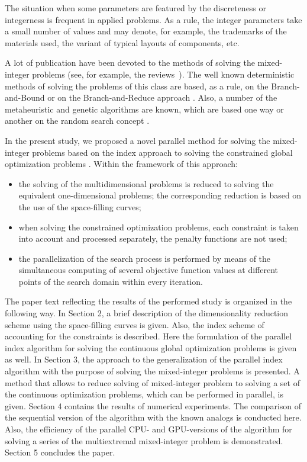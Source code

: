 \documentclass{llncs}
\begin{document}
The situation when some parameters are featured by the discreteness or integerness is frequent 
in applied problems. As a rule, the integer parameters take a small number of values and may 
denote, for example, the trademarks of the materials used, the variant of typical layouts of 
components, etc.

A lot of publication have been devoted to the methods of solving the mixed-integer problems 
(see, for example, the reviews~\cite{Burer,Boukouvala}). The well known deterministic 
methods of solving the problems of this class are based, as a rule, on the Branch-and-Bound 
\cite{Belotti} or on the Branch-and-Reduce approach \cite{Vigerske}. Also, a number of 
the metaheuristic and genetic 
algorithms are known, which are based one way or another on the random search concept 
\cite{Deep,Schluter}.

In the present study, we proposed a novel parallel method for solving the mixed-integer 
problems based on the index approach to solving the constrained global optimization 
problems \cite{Strongin2000,Strongin2013}. 
Within the framework of this approach: 
\begin{itemize}
	\item 
	the solving of the multidimensional problems is reduced to solving the equivalent one-dimensional problems; the corresponding reduction is based on the use of the space-filling curves;
	\item 
	when solving the constrained optimization problems, each constraint is taken into 
account and processed separately, the penalty functions are not used;
	\item 
	the parallelization of the search process is performed by means of the simultaneous 
computing of several objective function values at different points of the search domain within 
every iteration.
\end{itemize}

The paper text reflecting the results of the performed study is organized in the following way. 
In Section 2, a brief description of the dimensionality reduction scheme using the space-filling 
curves is given. Also, the index scheme of accounting for the constraints is described. Here the 
formulation of the parallel index algorithm for solving the continuous global optimization 
problems is given as well.
In Section 3, the approach to the generalization of the parallel index algorithm with the purpose 
of solving the mixed-integer problems is presented. A method that allows to reduce solving of 
mixed-integer problem to solving a set of the continuous optimization problems, which can be 
performed in parallel, is given. 
Section 4 contains the results of numerical experiments. The comparison of the sequential 
version of the algorithm with the known analogs is conducted here. Also, the efficiency of the 
parallel CPU- and GPU-versions of the algorithm for solving a series of the multiextremal 
mixed-integer problem is demonstrated. 
Section 5 concludes the paper.
\end{document}
